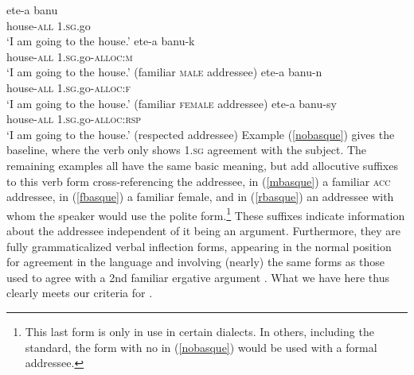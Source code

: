 \documentclass[output=paper, modfonts, nonflat]{langsci/langscibook}
\begin{document}
\ea\label{basque}
  \ea\label{nobasque}\gll et\eS e-a banu\\
  house-\textsc{all}{} 1.\textsc{sg}.go\\
  \glt `I am going to the house.'
  \ex\label{mbasque}\gll et\eS e-a banu-k\\
  house-\textsc{all}{} 1.\textsc{sg}.go-\textsc{alloc}:\textsc{m}\\
  \glt `I am going to the house.' (familiar \textsc{male} addressee)
  \ex\label{fbasque}\gll et\eS e-a banu-n\\
  house-\textsc{all}{} 1.\textsc{sg}.go-\textsc{alloc}:\textsc{f}\\
  \glt `I am going to the house.' (familiar \textsc{female} addressee)
  \ex\label{rbasque}\gll et\eS e-a banu-sy\\
  house-\textsc{all}{} 1.\textsc{sg}.go-\textsc{alloc}:\textsc{rsp}\\
  \glt `I am going to the house.' (respected addressee)
  \z
\z
%
Example (\ref{nobasque}) gives the baseline, where the verb only shows 1.\textsc{sg}
agreement with the subject. The remaining examples all have the same
basic meaning, but add allocutive suffixes to this verb form
cross-referencing the addressee, in (\ref{mbasque}) a familiar \textsc{acc}
addressee, in (\ref{fbasque}) a familiar female, and in
(\ref{rbasque}) an addressee with whom the speaker would use the
polite form.\footnote{This last form is only in use in certain
  dialects. In others, including the standard, the form with no
  \allagr{} in (\ref{nobasque}) would be used with a formal
  addressee.} These suffixes indicate information about the addressee
independent of it being an argument. Furthermore, they are fully
grammaticalized verbal inflection forms, appearing in the normal
position for agreement in the language and involving (nearly) the same
forms as those used to agree with a 2nd familiar ergative argument
\citep[see][66f. for discussion of the forms]{antonov:2015}. What
we have here thus clearly meets our criteria for \allagr{}.
\end{document}
